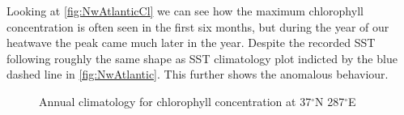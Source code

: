 Looking at \autoref{fig:NwAtlanticCl} we can see how the maximum chlorophyll concentration is often seen in the first six months, but during the year of our heatwave the peak came much later in the year. Despite the recorded SST following roughly the same shape as SST climatology plot indicted by the blue dashed line in \autoref{fig:NwAtlantic}. This further shows the anomalous behaviour. 

\begin{figure}[H]
\centering
            \caption{Annual climatology for chlorophyll concentration at 37$^{\circ}$N 287$^{\circ}$E}
            \label{fig:NwAtlanticCl}
\end{figure}